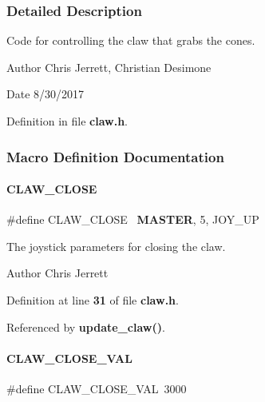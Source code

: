 \subsubsection{Detailed Description}
Code for controlling the claw that grabs the cones. 

\begin{DoxyAuthor}{Author}
Chris Jerrett, Christian Desimone 
\end{DoxyAuthor}
\begin{DoxyDate}{Date}
8/30/2017 
\end{DoxyDate}


Definition in file \textbf{ claw.\+h}.



\subsubsection{Macro Definition Documentation}
\mbox{\label{claw_8h_af2a18397e9efae0be9470a76797b2077}} 
\paragraph{C\+L\+A\+W\+\_\+\+C\+L\+O\+SE}
{\footnotesize\ttfamily \#define C\+L\+A\+W\+\_\+\+C\+L\+O\+SE~\textbf{ M\+A\+S\+T\+ER}, 5, J\+O\+Y\+\_\+\+UP}



The joystick parameters for closing the claw. 

\begin{DoxyAuthor}{Author}
Chris Jerrett 
\end{DoxyAuthor}


Definition at line \textbf{ 31} of file \textbf{ claw.\+h}.



Referenced by \textbf{ update\+\_\+claw()}.

\mbox{\label{claw_8h_a78d3e6f3d4b60e1be137fdc6dd144224}} 
\paragraph{C\+L\+A\+W\+\_\+\+C\+L\+O\+S\+E\+\_\+\+V\+AL}
{\footnotesize\ttfamily \#define C\+L\+A\+W\+\_\+\+C\+L\+O\+S\+E\+\_\+\+V\+AL~3000}



